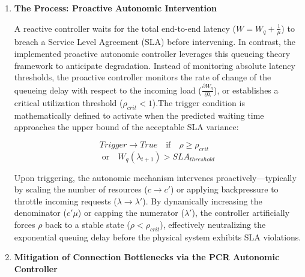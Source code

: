 \documentclass{ieeeaccess}
\begin{document}
\begin{enumerate}
	\item \textbf{The Process: Proactive Autonomic Intervention}
	
	A reactive controller waits for the total end-to-end latency ($W = W_q + \frac{1}{\mu}$) to breach a Service Level Agreement (SLA) before intervening. In contrast, the implemented proactive autonomic controller leverages this queueing theory framework to anticipate degradation. Instead of monitoring absolute latency thresholds, the proactive controller monitors the rate of change of the queueing delay with respect to the incoming load ($\frac{\partial W_q}{\partial \lambda}$), or establishes a critical utilization threshold ($\rho_{crit} < 1$).The trigger condition is mathematically defined to activate when the predicted waiting time approaches the upper bound of the acceptable SLA variance:
	
	
	$$Trigger \rightarrow True \quad \text{if} \quad \rho \ge \rho_{crit} \quad$$ 
	$$\text{or} \quad W_q(\lambda_{t+1}) > SLA_{threshold}$$
	
	
	Upon triggering, the autonomic mechanism intervenes proactively—typically by scaling the number of resources ($c \to c'$) or applying backpressure to throttle incoming requests ($\lambda \to \lambda'$). By dynamically increasing the denominator ($c'\mu$) or capping the numerator ($\lambda'$), the controller artificially forces $\rho$ back to a stable state ($\rho < \rho_{crit}$), effectively neutralizing the exponential queuing delay before the physical system exhibits SLA violations.
	
	\item \textbf{Mitigation of Connection Bottlenecks via the PCR Autonomic Controller}
	

\end{enumerate}
\end{document}
